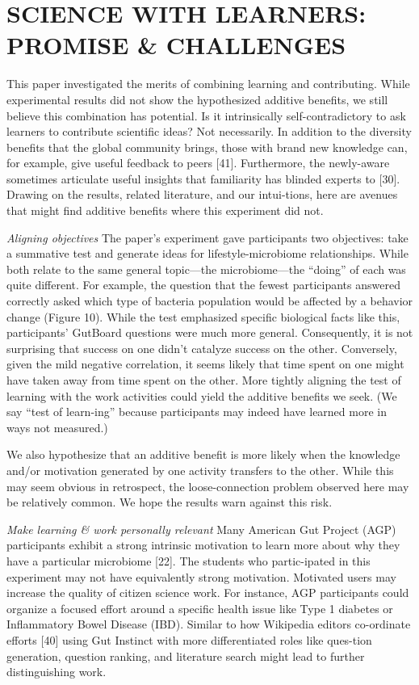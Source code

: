 \section{SCIENCE WITH LEARNERS: PROMISE \& CHALLENGES}
This paper investigated the merits of combining learning and contributing. While experimental results did not show the hypothesized additive benefits, we still believe this combination has potential. Is it intrinsically self-contradictory to ask learners to contribute scientific ideas? Not necessarily. In addition to the diversity benefits that the global community brings, those with brand new knowledge can, for example, give useful feedback to peers [41]. Furthermore, the newly-aware sometimes articulate useful insights that familiarity has blinded experts to [30]. Drawing on the results, related literature, and our intui-tions, here are avenues that might find additive benefits where this experiment did not.

\textit{Aligning objectives}
The paper’s experiment gave participants two objectives: take a summative test and generate ideas for lifestyle-microbiome relationships. While both relate to the same general topic—the microbiome—the “doing” of each was quite different. For example, the question that the fewest participants answered correctly asked which type of bacteria population would be affected by a behavior change (Figure 10). While the test emphasized specific biological facts like this, participants’ GutBoard questions were much more general. Consequently, it is not surprising that success on one didn’t catalyze success on the other. Conversely, given the mild negative correlation, it seems likely that time spent on one might have taken away from time spent on the other. More tightly aligning the test of learning with the work activities could yield the additive benefits we seek. (We say “test of learn-ing” because participants may indeed have learned more in ways not measured.) 

We also hypothesize that an additive benefit is more likely when the knowledge and/or motivation generated by one activity transfers to the other. While this may seem obvious in retrospect, the loose-connection problem observed here may be relatively common. We hope the results warn against this risk.

\textit{Make learning \& work personally relevant}
Many American Gut Project (AGP) participants exhibit a strong intrinsic motivation to learn more about why they have a particular microbiome [22]. The students who partic-ipated in this experiment may not have equivalently strong motivation. Motivated users may increase the quality of citizen science work. For instance, AGP participants could organize a focused effort around a specific health issue like Type 1 diabetes or Inflammatory Bowel Disease (IBD). Similar to how Wikipedia editors co-ordinate efforts [40] using Gut Instinct with more differentiated roles like ques-tion generation, question ranking, and literature search might lead to further distinguishing work.

